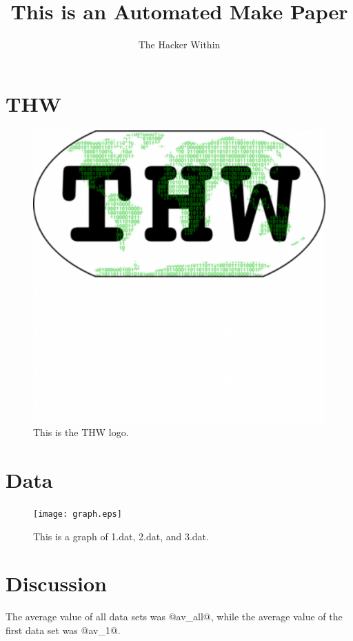 \documentclass[letterpaper]{article}
\author{The Hacker Within}
\date{}
\title{This is an Automated Make Paper}
\begin{document}
\maketitle
\section{THW}
\begin{figure}[htb!]
  \begin{center}
    \includegraphics{thw_icon.eps}
  \end{center}
  \caption{This is the THW logo. }
  \label{fig:thw_logo}
\end{figure}

\section{Data}
\begin{figure}[htb!]
  \begin{center}
    \texttt{[image: graph.eps]}
  \end{center}
  \caption{This is a graph of 1.dat, 2.dat, and 3.dat. }
  \label{fig:graph}
\end{figure}

\section{Discussion}

The average value of all data sets was @av_all@, while the average value of the 
first data set was @av_1@.
\end{document}
